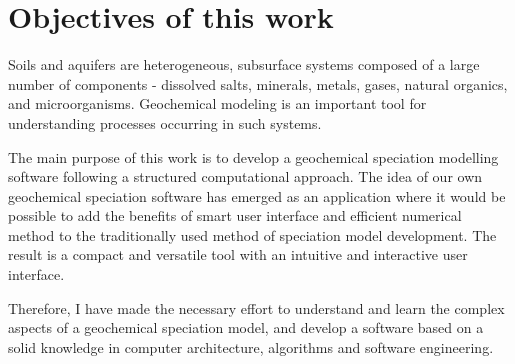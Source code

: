 
\section{Objectives of this work}


Soils and aquifers are heterogeneous, subsurface systems composed of a large number of components - dissolved salts, minerals, metals, gases, natural organics, and microorganisms. Geochemical modeling is an important tool for understanding processes occurring in such systems. 


The main purpose of this work is to develop a geochemical speciation modelling software following a structured computational approach. The idea of our own geochemical speciation software has emerged as an application where it would be possible to add the benefits of smart user interface and efficient numerical method to the traditionally used method of speciation model development. The result is a compact and versatile tool with an intuitive and interactive user interface.

Therefore, I have made the necessary effort to understand and learn the complex aspects of a geochemical speciation model, and develop a software based on a solid knowledge in computer architecture, algorithms and software engineering. 

